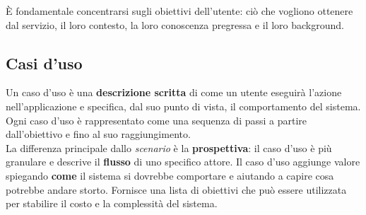 \begin{note}
	È fondamentale concentrarsi sugli obiettivi dell'utente: ciò che vogliono ottenere dal servizio, il loro contesto, la loro conoscenza pregressa e il loro background.
\end{note}

\subsection{Casi d'uso}
Un caso d'uso è una \textbf{descrizione scritta} di come un utente eseguirà l'azione nell'applicazione e specifica, dal suo punto di vista, il comportamento del sistema. Ogni caso d'uso è rappresentato come una sequenza di passi a partire dall'obiettivo e fino al suo raggiungimento.\\

La differenza principale dallo \textit{scenario} è la \textbf{prospettiva}: il caso d'uso è più granulare e descrive il \textbf{flusso} di uno specifico attore. Il caso d'uso aggiunge valore spiegando \textbf{come} il sistema si dovrebbe comportare e aiutando a capire cosa potrebbe andare storto. Fornisce una lista di obiettivi che può essere utilizzata per stabilire il costo e la complessità del sistema.

